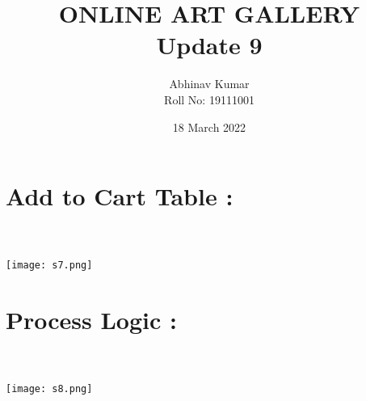 \documentclass{article}
\title{ONLINE ART GALLERY \\ Update 9}
\date{18 March 2022}
\author{Abhinav Kumar \\ Roll No: 19111001 }
\begin{document}
\maketitle
\section*{Add to Cart Table : }
\\
\\
\texttt{[image: s7.png]}
\section*{Process Logic : }
\\
\\
\texttt{[image: s8.png]}
\end{document}
